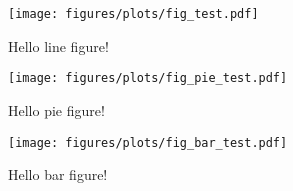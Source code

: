 
\begin{figure}[H]
  \begin{center}
    \texttt{[image: figures/plots/fig\_test.pdf]}
    \caption{Hello line figure!}
  \end{center}
\end{figure}

\begin{figure}[H]
  \begin{center}
    \vspace{-0.3cm}
    \texttt{[image: figures/plots/fig\_pie\_test.pdf]}
    \vspace{-0.5cm}
    \caption{Hello pie figure!}
  \end{center}
\end{figure}

\begin{figure}[H]
  \begin{center}
    \texttt{[image: figures/plots/fig\_bar\_test.pdf]}
    \caption{Hello bar figure!}
  \end{center}
\end{figure}
